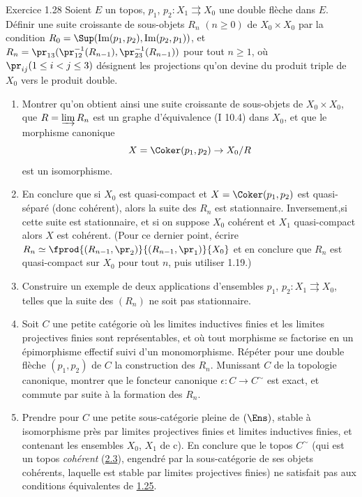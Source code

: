 \begin{enonce*}[remark]{Exercice 1.28}
Soient $E$ un topos, $p_1$, $p_2 : X_1 \rightrightarrows X_0$ une double
flèche dans $E$. Définir une suite croissante de sous-objets $R_n$ $(n
\geq 0)$ de $X_0\times X_0$ par la condition $R_0 = \Sup(\text{Im}(p_1,
p_2), \text{Im}(p_2, p_1))$, et $R_n = \pr_{13} (\pr_{12}^{-1} (R_{n-1}),
\pr_{23}^{-1}(R_{n-1}))$ pour tout $n \geq 1$, où $\pr_{ij} (1 \leq i
< j \leq 3)$ désignent les projections qu'on devine du produit triple
de $X_0$ vers le produit double.
\begin{enumerate}
\renewcommand{\theenumi}{\alph{enumi}}
\renewcommand{\labelenumi}{\theenumi)}
\item Montrer qu'on obtient ainsi une suite croissante de sous-objets
  de $X_0\times X_0$, que $R = \varinjlim R_n$ est un graphe
  d'équivalence (I 10.4) dans $X_0$, et que le morphisme canonique
$$
X = \Coker (p_1, p_2) \to X_0 /R
$$
est un isomorphisme.

\item En conclure que si $X_0$ est quasi-compact et $X = \Coker(p_1,
  p_2)$ est quasi-séparé (donc cohérent), alors la suite des $R_n$ est
  stationnaire. Inversement,\pageoriginale si cette suite est
  stationnaire, et si on suppose $X_0$
cohérent et $X_1$ quasi-compact alors $X$ est cohérent. (Pour ce
dernier point, écrire $R_n \simeq \fprod{(R_{n-1}, \pr_2)}{(R_{n-1},
  \pr_1)}{X_0}$ et en conclure que $R_n$ est quasi-compact sur $X_0$
pour tout $n$, puis utiliser 1.19.)

\item Construire un exemple de deux applications d'ensembles $p_1$, $p_2
  : X_1 \rightrightarrows X_0$, telles que la suite des $(R_n)$ ne
  soit pas stationnaire.

\item Soit $C$ une petite catégorie où les limites inductives finies
  et les limites projectives finies sont représentables, et où tout
  morphisme se factorise en un épimorphisme effectif suivi d'un
  monomorphisme. Répéter pour une double flèche $(p_1, p_2)$ de $C$ la
  construction des $R_n$. Munissant $C$ de la topologie canonique,
  montrer que le foncteur canonique $\epsilon : C \to C^{\sim}$ est exact, et
  commute par suite à la formation des $R_n$.

\item Prendre pour $C$ une petite sous-catégorie pleine de $(\Ens)$,
  stable à isomorphisme près par limites projectives finies et limites
  inductives finies, et contenant les ensembles $X_0$, $X_1$ de c). En
  conclure que le topos $C^{\sim}$ (qui est un topos
  \emph{cohérent} (\hyperref[VI.def2.3]{2.3}), \ie engendré par la sous-catégorie de ses
  objets cohérents, laquelle est stable par limites projectives finies)
  ne satisfait pas aux conditions équivalentes de \hyperref[VI.cor1.25]{1.25}.


\end{enumerate}
\end{enonce*}
